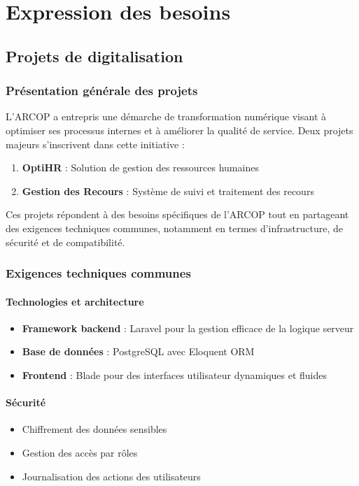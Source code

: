 \chapter{Expression des besoins}
\clearpage

\section{Projets de digitalisation}

\subsection{Présentation générale des projets}
L'ARCOP a entrepris une démarche de transformation numérique visant à optimiser ses processus internes et à améliorer la qualité de service. Deux projets majeurs s'inscrivent dans cette initiative :
\begin{enumerate}
    \item \textbf{OptiHR} : Solution de gestion des ressources humaines
    \item \textbf{Gestion des Recours} : Système de suivi et traitement des recours
\end{enumerate}

Ces projets répondent à des besoins spécifiques de l'ARCOP tout en partageant des exigences techniques communes, notamment en termes d'infrastructure, de sécurité et de compatibilité.

\subsection{Exigences techniques communes}
\subsubsection{Technologies et architecture}
\begin{itemize}
    \item \textbf{Framework backend} : Laravel pour la gestion efficace de la logique serveur
    \item \textbf{Base de données} : PostgreSQL avec Eloquent ORM
    \item \textbf{Frontend} : Blade pour des interfaces utilisateur dynamiques et fluides
\end{itemize}

\subsubsection{Sécurité}
\begin{itemize}
    \item Chiffrement des données sensibles
    \item Gestion des accès par rôles
    \item Journalisation des actions des utilisateurs
\end{itemize}

